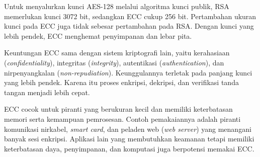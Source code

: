 Untuk menyalurkan kunci AES-128 melalui algoritma kunci publik, RSA memerlukan
kunci 3072 bit, sedangkan ECC cukup 256 bit. Pertambahan ukuran kunci pada ECC
juga tidak sebesar pertambahan pada RSA. Dengan kunci yang lebih pendek, ECC
menghemat penyimpanan dan lebar pita.

Keuntungan ECC sama dengan sistem kriptografi lain, yaitu kerahasiaan
(\textit{confidentiality}), integritas (\textit{integrity}), autentikasi
(\textit{authentication}), dan nirpenyangkalan (\textit{non-repudiation}). Keunggulannya terletak pada
panjang kunci yang lebih pendek. Karena itu proses enkripsi, dekripsi, dan
verifikasi tanda tangan menjadi lebih cepat.

ECC cocok untuk piranti yang berukuran kecil dan memiliki keterbatasan memori
serta kemampuan pemrosesan. Contoh pemakaiannya adalah piranti komunikasi
nirkabel, \textit{smart card}, dan peladen web (\textit{web server}) yang
menangani banyak sesi enkripsi. Aplikasi lain yang membutuhkan keamanan tetapi memiliki keterbatasan
daya, penyimpanan, dan komputasi juga berpotensi memakai ECC.
